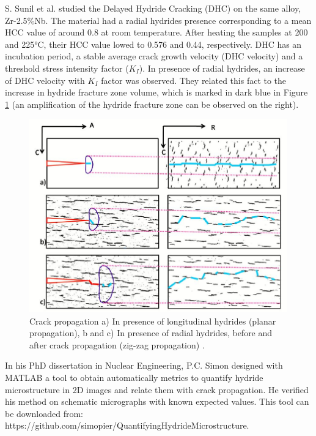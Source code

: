 \noindent
S. Sunil et al. \cite{SUNIL} studied the Delayed Hydride Cracking (DHC) on the same alloy, Zr-2.5\%Nb. The material had a radial hydrides presence corresponding to a mean HCC value of around 0.8 at room temperature. After heating the samples at 200 and 225°C, their HCC value lowed to 0.576 and 0.44, respectively. DHC has an incubation period, a stable average crack growth velocity (DHC velocity) and a threshold stress intensity factor ($K_I$). In presence of radial hydrides, an increase of DHC velocity with $K_I$ factor was observed. They related this fact to the increase in hydride fracture zone volume, which is marked in dark blue in Figure \ref{fig:ref3} (an amplification of the hydride fracture zone can be observed on the right).

\begin{figure}[h] %
    \centering
    \includegraphics[width=4.4in]{Figures/4-Lit. Review/propagation.JPG}
    \caption{Crack propagation a) In presence of longitudinal hydrides (planar propagation), b and c) In presence of radial hydrides, before and after crack propagation (zig-zag propagation)  \cite{SUNIL}.}
    \label{fig:ref3}
\end{figure}


\noindent
In his PhD dissertation in Nuclear Engineering, P.C. Simon \cite{thesis} designed with MATLAB a tool to obtain automatically metrics to quantify hydride microstructure in 2D images and relate them with crack propagation. He verified  his method on schematic micrographs with known expected values. This tool can be downloaded from: https://github.com/simopier/QuantifyingHydrideMicrostructure. 

\cite{COLAS2013586}

\cite{SUNIL}